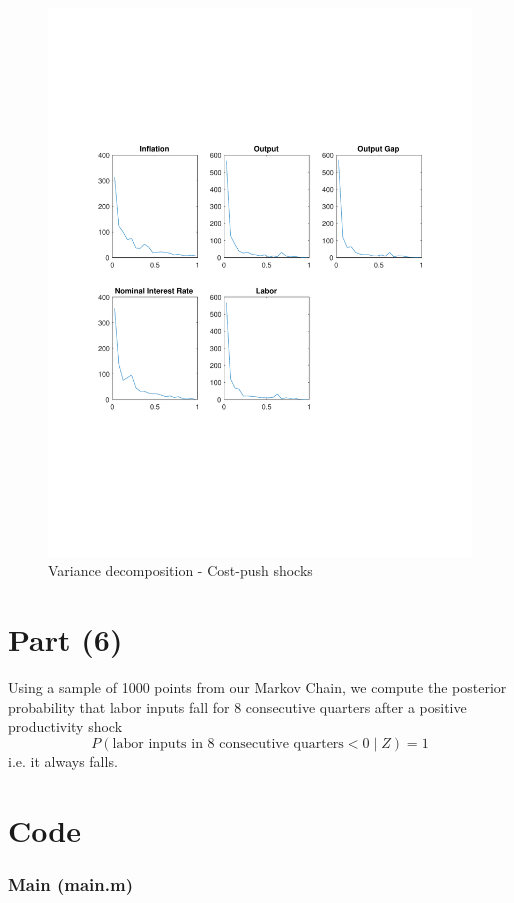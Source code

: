 \documentclass[12pt]{article}
\theoremstyle{definition}
\begin{document}
\begin{figure}[H]
	\centering
	\includegraphics[width=\linewidth, height = 0.4\textheight]{var_cost}
	\caption{Variance decomposition - Cost-push shocks}
	\label{fig:var_cost}
\end{figure}


\section*{Part (6)}
Using a sample of 1000 points from our Markov Chain, we compute the posterior probability that labor inputs fall for 8 consecutive quarters after a positive productivity shock
\[
P(\text{labor inputs in 8 consecutive quarters}<0 \mid Z) = 1
\]
i.e. it always falls.

\section*{Code}
\subsubsection*{Main (main.m)}

\end{document}
